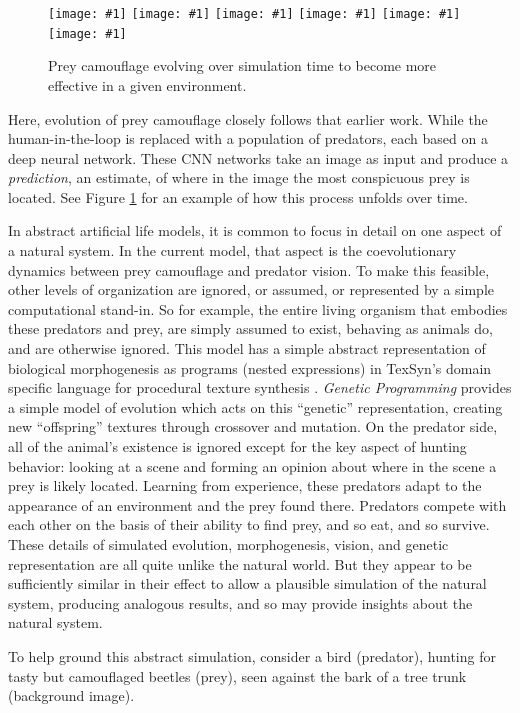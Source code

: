 \documentclass[letterpaper]{article}
\newcommand{\jargon}[1]{\textit{#1}}
\newcommand{\texsyn}[0]{TexSyn}
\newcommand{\igsix}[1]{\texttt{[image: \#1]}}
\begin{document}
\begin{figure}[t]
    \igsix{20221030_1220_step_19.png}
    \hfill
    \igsix{20221030_1220_step_1045.png}
    \hfill
    \igsix{20221030_1220_step_2014.png}
    \hfill
    \igsix{20221030_1220_step_3059.png}
    \hfill
    \igsix{20221030_1220_step_6650.png}
    \hfill
    \igsix{20221030_1220_step_7467.png}
    \caption{Prey camouflage evolving over simulation time to become more effective in a given environment.}
    \label{fig:time_sequence}
\end{figure}


Here, evolution of prey camouflage closely follows that earlier work. While the human-in-the-loop is replaced with a population of predators, each based on a deep neural network. These CNN networks take an image as input and produce a \jargon{prediction}, an estimate, of where in the image the most conspicuous prey is located. See Figure \ref{fig:time_sequence} for an example of how this process unfolds over time.
\par
In abstract artificial life models, it is common to focus in detail on one aspect of a natural system. In the current model, that aspect is the coevolutionary dynamics between prey camouflage and predator vision. To make this feasible, other levels of organization are ignored, or assumed, or represented by a simple computational stand-in. So for example, the entire living organism that embodies these predators and prey, are simply assumed to exist, behaving as animals do, and are otherwise ignored. This model has a simple abstract representation of biological morphogenesis as programs (nested expressions) in \texsyn{}'s domain specific language for procedural texture synthesis \citep{reynolds_texsyn_2019}. \jargon{Genetic Programming} provides a simple model of evolution which acts on this ``genetic'' representation, creating new ``offspring'' textures through crossover and mutation. On the predator side, all of the animal's existence is ignored except for the key aspect of hunting behavior: looking at a scene and forming an opinion about where in the scene a prey is likely located. Learning from experience, these predators adapt to the appearance of an environment and the prey found there. Predators compete with each other on the basis of their ability to find prey, and so eat, and so survive. These details of simulated evolution, morphogenesis, vision, and genetic representation are all quite unlike the natural world. But they appear to be sufficiently similar in their effect to allow a plausible simulation of the natural system, producing analogous results, and so may provide insights about the natural system.
\par
To help ground this abstract simulation, consider a bird (predator), hunting for tasty but camouflaged beetles (prey), seen against the bark of a tree trunk (background image).
\par
\end{document}
